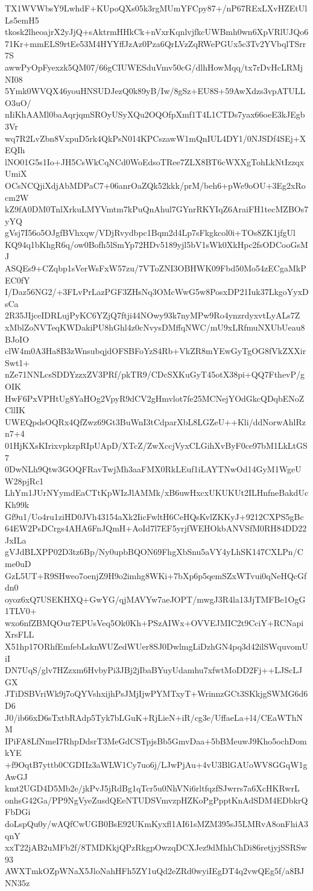 TX1WVWbsY9LwhdF+KUpoQXs05k3rgMUmYFCpy87+/nP67RExLXvHZEtUlLs5emH5
tkosk2lheoajrX2yJjQ+sAktrmHHkCk+nVxrKqnlvjfkcUWBmh0wn6XpVRlUJQo6
71Kr+mmELS9rtEe53M4HYYffJzAz0Pza6QrLVzZqRWePGUx5c3Tv2YVbqlTSrr7S
awwPyOpFyexzk5QM07/66gCIUWESduVmv50cG/dlhHowMqq/tx7rDvHcLRMjNI08
5Ymk0WVQX46youHNSUDJezQ0k89yB/Iw/8gSz+EU8S+59AwXdzs3vpATULLO3uO/
nIiKhAAMl0baAqrjqmSROyUSyXQu2OQOfpXmf1T4L1CTDs7yax66oeE3kJEgb3Vr
wq7R2LvZbn8VxpuD5rk4QkPsN014KPCszawW1mQnIUL4DY1/0NJSDf4SEj+XEQIh
lNO01G5s1Io+JH5CsWkCqNCd0WoEdsoTRee7ZLX8BT6cWXXgTohLkNtIzzqxUmiX
OCsNCQjiXdjAbMDPaC7+06anrOaZQk52kkk/prM/beh6+pWe9oOU+3Eg2xRocm2W
kZ9fA0DM0TnlXrkuLMYVmtm7kPuQnAhul7GYnrRKYIqZ6AraiFH1tecMZBOs7yYQ
gVsj7I56o5OJgfBVhxqw/VDjRvydbpc1Bqm2d4Lp7sFkgkcol0i+TOs8ZK1jfgUl
KQ94q1bKhgR6q/ow0Bofh5lSmYp72HDv5189yjl5bV1sWk0XkHpc2fsODCooGsMJ
ASQEs9+CZqbp1sVerWsFxW57zu/7VToZNI3OBHWK09Fbd50Mo54zECgaMkPEC0fY
I/Daz56NG2/+3FLvPrLazPGF3ZHsNq3OMcWwG5w8PosxDP21Iuk37LkgoYyxDsCa
2R35JIjceIDRLujPyKC6YZjQ7ftji44NOwy93k7nyMPw9Ro4ynzrdyxvtLyALs7Z
xMblZoNVTeqKWDakiPU8hGhl4z0cNvysDMffqNWC/mU9xLRfmuNXUbUeau8BJoIO
clW4m0A3Ha8B3zWnsubqjdOFSBFoYzS4Rb+VkZR8mYEwGyTgOG8fVkZXXirSwt1+
nZe71NNLcsSDDYzzxZV3PRf/pkTR9/CDcSXKuGyT45otX38pi+QQ7FthevP/gOIK
HwF6PxVPHtUg8YaHOg2VpyR9dCV2gHmvlot7fe25MCNejYOdGkcQDqbENoZCllIK
UWEQpdsOQRx4QfZwz69Gt3BuWnI3tCdparXbL8LGZeU++Kli/ddNorwAhlRzn7+4
01HjKXsKIrixvpkzpRIpUApD/XTcZ/ZwXccjVyxCLGihXvByF0ce97bM1LkLtGS7
0DwNLh9Qtw3GOQFRavTwjMh3aaFMX0RkLEuf1iLAYTNwOd14GyM1WgeUW28pjRc1
LhYm1JUrNYymdEaCTtKpWIzJlAMMk/xB6uwHxcxUKUKUt2ILHnfneBakdUcKh99k
Gf9u1/Uo4ru1ziHD0JVh43154aXk2IicFwltH6CeHQsKvlZKKyJ+9212CXPS5gBc
64EW2PsDCrgs4AHA6FnJQmH+AoId7l7EF5yrjfWEHOkbANVSfM0RH84DD22JxILa
gVJdBLXPP02D3tz6Bp/Ny0upbBQON69FhgXbSnu5aVY4yLhSK147CXLPn/Cme0uD
GzL5UT+R9SHweo7oenjZ9H9o2imhg8WKi+7bXp6p5qemSZxWTvui0qNeHQcGfdn0
oyoz6xQ7USEKHXQ+GwYG/qjMAVYw7aeJOPT/mwgJ3R4la13JjTMFBe1OgG1TLV0+
wxo6nfZBMQOur7EPUsVeq5Ok0Kh+PSzAIWx+OVVEJMIC2t9CciY+RCNapiXrsFLL
X51hp17ORhfEmfebLsknWUZedWUer8SJ0DwlmgLiDzhGN4pq3d42ilSWquvomUiI
DN7UqS/glv7HZzxm6HvbyPi3JBj2jIbaBYuyUdamhu7xfwtMoDD2Fj++LJScLJGX
JTiDSBVriWk9j7oQYVshxijhPsJMjIjwPYMTxyT+WrinnzGCt3SKkjgSWMG6d6D6
J0/ib66xD6sTxtbRAdp5Tyk7bLGuK+RjLieN+iR/cg3e/UffaeLa+l4/CEaWThNM
IPiFA8LfNmeI7RhpDdsrT3MeGdCSTpjsBb5GmvDaa+5bBMeuwJ9Kho5ochDomkYE
+f9OqtB7yttb0CGDIIz3aWLW1Cy7uo6j/LJwPjAu+4vU3BlGAUoWV8GGqW1gAwGJ
kmt2UGD4D5Mb2e/jkPvJ5jRdBg1qTcr5u0NhVNi6rltfqzfSJwrrs7a6XcHKRwrL
onhsG42Ga/PP9NgVyeZusdQEeNTUDSVmvzpHZKoPgPpptKnAdSDM4EDbkrQFbDGi
doLspQu0y/wAQfCwUGB0BsE92UKmKyxfl1AI61sMZM395sJ5LMRvA8onFhiA3qnY
xxT22jAB2uMFb2f/8TMDKkjQPzRkgpOwzqDCXJez9dMhhChDi86retjyjSSRSw93
AWXTmkOZpWNaX5JloNahHFh5ZY1uQd2eZRd0wyiIEgDT4q2vwQEg5f/a8BJNN35z
